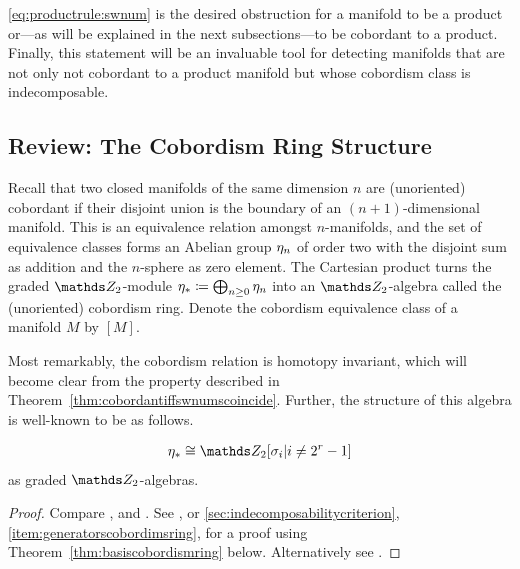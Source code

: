 \autoref{eq:productrule:swnum} is the desired obstruction for
a manifold to be a product or---as will be explained in the next
subsections---to be cobordant to a product.
Finally, this statement will be an invaluable tool for detecting
manifolds that are not only not cobordant to a product manifold but
whose cobordism class is indecomposable.

\subsection{Review: The Cobordism Ring Structure}
\label{sec:cobordismringstructure}
Recall that two closed manifolds of the same dimension $n$ are
(unoriented) cobordant if their disjoint union is the boundary of an
$(n+1)$-dimensional manifold.
This is an equivalence relation amongst $n$-manifolds, and the
set of equivalence classes forms an Abelian group $\eta_n$ of order two
with the disjoint sum as addition and the $n$-sphere as zero element.
The Cartesian product turns the graded $\Zmod2$-module
$\eta_*\coloneqq \bigoplus_{n\geq 0}\eta_n$ into an $\Zmod2$-algebra
called the (unoriented) cobordism ring.
Denote the cobordism equivalence class of a manifold $M$ by $[M]$.

Most remarkably, the cobordism relation is homotopy invariant, which
will become clear from the property described in
Theorem~\ref{thm:cobordantiffswnumscoincide}.
Further, the structure of this algebra is well-known to be as follows.
\begin{Thm}[Thom]\label{thm:cobordismringstructure}
  \begin{gather*}
    \c_*
    \cong \Zmod2[\sigma_i| i\neq 2^r-1]
  \end{gather*}
  as graded $\Zmod2$-algebras.
  \begin{proof}
    Compare \cite[Thm.~1.23]{immersionconj}, and
    \cite[Theorem~IV.9]{thom}.
    See \cite[Theorem~IV.12]{thom}, or
    \autoref{sec:indecomposabilitycriterion},
    \ref{item:generatorscobordimsring}, for a proof using
    Theorem~\ref{thm:basiscobordismring} below.
    Alternatively see \cite[Chap.~VI]{stong}.
  \end{proof}
\end{Thm}

